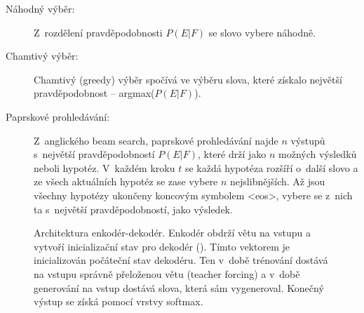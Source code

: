 \begin{description}
  \item[Náhodný výběr:] Z~rozdělení pravděpodobnosti $P(E|F)$ se slovo vybere náhodně.
  \item[Chamtivý výběr:] Chamtivý (greedy) výběr spočívá ve výběru slova, které získalo největší pravděpodobnost -- argmax($P(E|F)$).
  \item[Paprskové prohledávání:]\label{decsription:beamsearch} Z~anglického beam search, paprskové prohledávání najde $n$ výstupů s~největší pravděpodobností $P(E|F)$, které drží jako $n$ možných výsledků neboli hypotéz. V~každém kroku $t$ se každá hypotéza rozšíří o~další slovo a ze všech aktuálních hypotéz se zase vybere $n$ nejslibnějších. Až jsou všechny hypotézy ukončeny koncovým symbolem <eos>, vybere se z~nich ta s~největší pravděpodobností, jako výsledek.
\end{description}


\begin{figure}[H]
    \begin{center}
    \end{center}
	\caption{Architektura enkodér-dekodér. Enkodér obdrží větu na vstupu a vytvoří inicializační stav pro dekodér (). Tímto vektorem je inicializován počáteční stav dekodéru. Ten v~době trénování dostává na vstupu správně přeloženou větu (teacher forcing) a v~době generování na vstup dostává slova, která sám vygeneroval. Konečný výstup se získá pomocí vrstvy softmax.}
	\label{img:seq2seq}
\end{figure}


